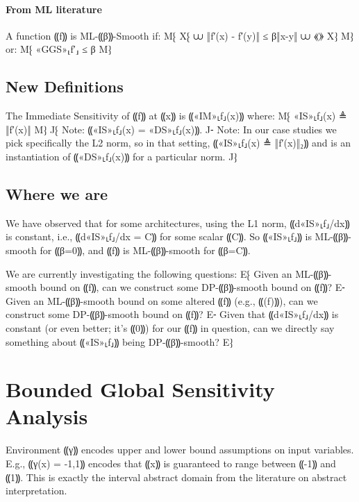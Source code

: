 \documentclass{article}
\begin{document}
\paragraph{From ML literature}

\begin{definition}[ML-⸨β⸩-Smoothness]
  A function ⸨f⸩ is ML-⸨β⸩-Smooth if:
  M⁅ X⁅ ⩊ ‖f′(x) - f′(y)‖ ≤ β‖x-y‖ 
        ⩊ ⟪\citep[§ 3]{convex-optimization-ml-slides}⟫
     X⁆
  M⁆
  or:
  M⁅ «GGS»⸤f′⸥ ≤ β M⁆
\end{definition}

\subsection{New Definitions}

\begin{definition}
  The Immediate Sensitivity of ⸨f⸩ at ⸨x⸩ is ⸨«IM»⸤f⸥(x)⸩ where:
  M⁅ «IS»⸤f⸥(x) ≜ ‖f′(x)‖ M⁆
  J⁅ Note: ⸨«IS»⸤f⸥(x) = «DS»⸤f⸥(x)⸩.
  J⁃ Note: In our case studies we pick specifically the L2 norm, so in that
     setting, ⸨«IS»⸤f⸥(x) ≜ ‖f′(x)‖₂⸩ and is an instantiation of ⸨«DS»⸤f⸥(x)⸩
     for a particular norm.
  J⁆
\end{definition}

\subsection{Where we are}

We have observed that for some architectures, using the L1 norm, ⸨d«IS»⸤f⸥/dx⸩
is constant, i.e.,  ⸨d«IS»⸤f⸥/dx = C⸩ for some scalar ⸨C⸩. So ⸨«IS»⸤f⸥⸩ is
ML-⸨β⸩-smooth for ⸨β=0⸩, and ⸨f⸩ is ML-⸨β⸩-smooth for ⸨β=C⸩.

We are currently investigating the following questions:
E⁅ Given an ML-⸨β⸩-smooth bound on ⸨f⸩, can we construct some DP-⸨β⸩-smooth bound
   on ⸨f⸩?
E⁃ Given an ML-⸨β⸩-smooth bound on some altered ⸨f⸩ (e.g., ⸨\ln(f)⸩), can we
   construct some DP-⸨β⸩-smooth bound on ⸨f⸩?
E⁃ Given that ⸨d«IS»⸤f⸥/dx⸩ is constant (or even better; it's ⸨0⸩) for our ⸨f⸩
   in question, can we directly say something about ⸨«IS»⸤f⸥⸩ being DP-⸨β⸩-smooth?
E⁆

\section{Bounded Global Sensitivity Analysis}

Environment ⸨γ⸩ encodes upper and lower bound assumptions on input variables.
E.g., ⸨γ(x) = -1,1⸩ encodes that ⸨x⸩ is guaranteed to range between ⸨-1⸩ and
⸨1⸩. This is exactly the interval abstract domain from the literature on
abstract interpretation.
\end{document}
